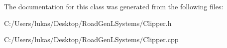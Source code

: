 The documentation for this class was generated from the following files\+:\begin{DoxyCompactItemize}
\item 
C\+:/\+Users/lukas/\+Desktop/\+Road\+Gen\+L\+Systems/Clipper.\+h\item 
C\+:/\+Users/lukas/\+Desktop/\+Road\+Gen\+L\+Systems/Clipper.\+cpp\end{DoxyCompactItemize}

